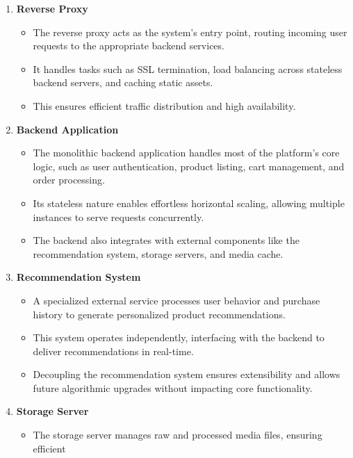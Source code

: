 \documentclass[12pt]{report}
\begin{document}
\begin{enumerate}
	\item \textbf{Reverse Proxy}
	      \begin{itemize}
		      \item The reverse proxy acts as the system’s entry point, routing incoming user
		            requests to the appropriate backend services.
		      \item It handles tasks such as SSL termination, load balancing across stateless
		            backend servers, and caching static assets.
		      \item This ensures efficient traffic distribution and high availability.
	      \end{itemize}
	\item \textbf{Backend Application}
	      \begin{itemize}
		      \item The monolithic backend application handles most of the platform’s core logic,
		            such as user authentication, product listing, cart management, and order
		            processing.
		      \item Its stateless nature enables effortless horizontal scaling, allowing multiple
		            instances to serve requests concurrently.
		      \item The backend also integrates with external components like the
		            recommendation system, storage servers, and media cache.
	      \end{itemize}
	\item \textbf{Recommendation System}
	      \begin{itemize}
		      \item A specialized external service processes user behavior and purchase history to
		            generate personalized product recommendations.
		      \item This system operates independently, interfacing with the backend to deliver
		            recommendations in real-time.
		      \item Decoupling the recommendation system ensures extensibility and allows
		            future algorithmic upgrades without impacting core functionality.
	      \end{itemize}
	\item \textbf{Storage Server}
	      \begin{itemize}
		      \item The storage server manages raw and processed media files, ensuring efficient

\end{itemize}
\end{enumerate}
\end{document}
